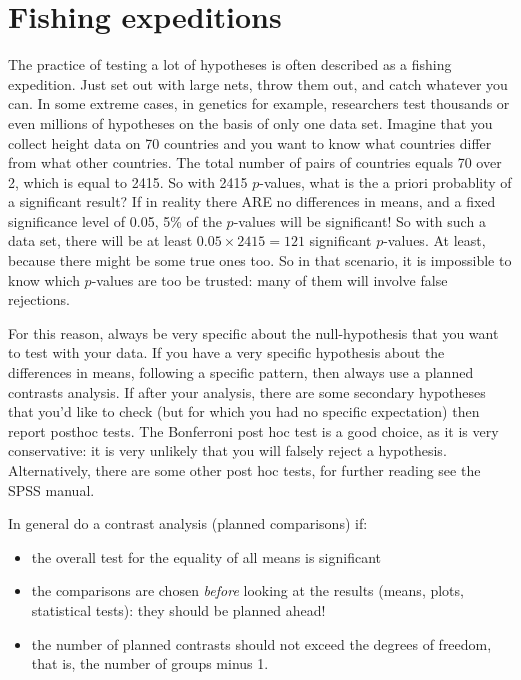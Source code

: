 \documentclass[]{book}\usepackage[]{graphicx}\usepackage[]{color}
\begin{document}



\section{Fishing expeditions}
The practice of testing a lot of hypotheses is often described as a fishing expedition. Just set out with large nets, throw them out, and catch whatever you can. In some extreme cases, in genetics for example, researchers test thousands or even millions of hypotheses on the basis of only one data set. Imagine that you collect height data on 70 countries and you want to know what countries differ from what other countries. The total number of pairs of countries equals 70 over 2, which is equal to 2415. So with 2415 $p$-values, what is the a priori probablity of a significant result? If in reality there ARE no differences in means, and a fixed significance level of 0.05, 5\% of the $p$-values will be significant! So with such a data set, there will be at least $0.05 \times 2415 = 121$ significant $p$-values. At least, because there might be some true ones too. So in that scenario, it is impossible to know which $p$-values are too be trusted: many of them will involve false rejections.

For this reason, always be very specific about the null-hypothesis that you want to test with your data. If you have a very specific hypothesis about the differences in means, following a specific pattern, then always use a planned contrasts analysis. If after your analysis, there are some secondary hypotheses that you'd like to check (but for which you had no specific expectation) then report posthoc tests. The Bonferroni post hoc test is a good choice, as it is very conservative: it is very unlikely that you will falsely reject a hypothesis. Alternatively, there are some other post hoc tests, for further reading see the SPSS manual.

In general do a contrast analysis (planned comparisons) if:


\begin{itemize}
\item the overall test for the equality of all means is significant
\item the comparisons are chosen \textit{before} looking at the results (means, plots, statistical tests): they should be planned ahead!
\item the number of planned contrasts should not exceed the degrees of freedom, that is, the number of groups minus 1. 
\end{itemize}
\end{document}
